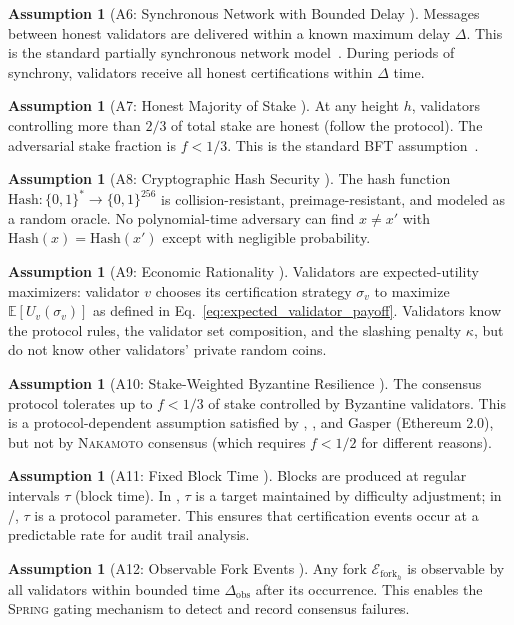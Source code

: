 \documentclass[11pt,a4paper]{article}
\theoremstyle{definition}
\newtheorem{assumption}[theorem]{Assumption}
\newcommand{\Spring}{\textsc{Spring}}
\newcommand{\E}{\mathbb{E}}
\newcommand{\forkEvent}{\mathcal{E}_{\mathrm{fork}}}
\newcommand{\Nakamoto}{\textsc{Nakamoto}}
\newcommand{\PoW}{\mathrm{PoW}}
\newcommand{\PoS}{\mathrm{PoS}}
\newcommand{\PBFT}{\mathrm{PBFT}}
\newcommand{\Tendermint}{\mathrm{Tendermint}}
\begin{document}
\begin{assumption}[A6: Synchronous Network with Bounded Delay ]
\label{ass:A6}
Messages between honest validators are delivered within a known maximum delay $\Delta$. This is the standard partially synchronous network model~\cite{DworkLynchStockmeyer1988}. During periods of synchrony, validators receive all honest certifications within $\Delta$ time.
\end{assumption}
\begin{assumption}[A7: Honest Majority of Stake ]
\label{ass:A7}
At any height $h$, validators controlling more than $2/3$ of total stake are honest (follow the protocol). The adversarial stake fraction is $f < 1/3$. This is the standard BFT assumption~\cite{CastroLiskov1999}.
\end{assumption}
\begin{assumption}[A8: Cryptographic Hash Security ]
\label{ass:A8}
The hash function $\mathrm{Hash}: \{0,1\}^* \to \{0,1\}^{256}$ is collision-resistant, preimage-resistant, and modeled as a random oracle. No polynomial-time adversary can find $x \neq x'$ with $\mathrm{Hash}(x) = \mathrm{Hash}(x')$ except with negligible probability.
\end{assumption}
\begin{assumption}[A9: Economic Rationality ]
\label{ass:A9}
Validators are expected-utility maximizers: validator $v$ chooses its certification strategy $\sigma_v$ to maximize $\E[U_v(\sigma_v)]$ as defined in Eq.~\eqref{eq:expected_validator_payoff}. Validators know the protocol rules, the validator set composition, and the slashing penalty $\kappa$, but do not know other validators' private random coins.
\end{assumption}
\begin{assumption}[A10: Stake-Weighted Byzantine Resilience ]
\label{ass:A10}
The consensus protocol tolerates up to $f < 1/3$ of stake controlled by Byzantine validators. This is a protocol-dependent assumption satisfied by \PBFT{}, \Tendermint{}, and Gasper (Ethereum 2.0), but not by \Nakamoto{} consensus (which requires $f < 1/2$ for different reasons).
\end{assumption}
\begin{assumption}[A11: Fixed Block Time ]
\label{ass:A11}
Blocks are produced at regular intervals $\tau$ (block time). In \PoW{}, $\tau$ is a target maintained by difficulty adjustment; in \PoS{}/\PBFT{}, $\tau$ is a protocol parameter. This ensures that certification events occur at a predictable rate for audit trail analysis.
\end{assumption}
\begin{assumption}[A12: Observable Fork Events ]
\label{ass:A12}
Any fork $\forkEvent_h$ is observable by all validators within bounded time $\Delta_{\mathrm{obs}}$ after its occurrence. This enables the \Spring{} gating mechanism to detect and record consensus failures.
\end{assumption}
\end{document}
